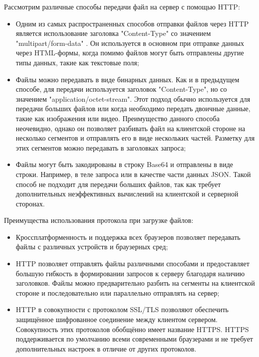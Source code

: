 	Рассмотрим различные способы передачи файл на сервер с помощью HTTP:
	\begin{itemize}[label=$\bullet$]
		\item Одним из самых распространенных способов отправки файлов через HTTP является использование заголовка "Content-Type" со значением "multipart/form-data" \cite{rfcHttp10}. Он используется в основном при отправке данных через HTML-формы, когда помимо файлов могут быть отправлены другие типы данных, такие как текстовые поля;
		\item Файлы можно передавать в виде бинарных данных. Как и в предыдущем способе, для передачи используется заголовок "Content-Type", но со значением "application/octet-stream". Этот подход обычно используется для передачи больших файлов или когда необходимо передать двоичные данные, такие как изображения или видео. Преимущество данного способа неочевидно, однако он позволяет разбивать файл на клиентской стороне на несколько сегментов и отправлять его в виде нескольких частей. Разметку для этих сегментов можно передавать в заголовках запроса;
		\item Файлы могут быть закодированы в строку Base64 и отправлены в виде строки. Например, в теле запроса или в качестве части данных JSON. Такой способ не подходит для передачи больших файлов, так как требует дополнительных неэффективных вычислений на клиентской и серверной сторонах.
	\end{itemize}

	Преимущества использования протокола при загрузке файлов:
	\begin{itemize}[label=$\bullet$]
		\item Кроссплатформенность и поддержка всех браузеров позволяет передавать файлы с различных устройств и браузерных сред;
		\item HTTP позволяет отправлять файлы различными способами и предоставляет большую гибкость в формировании запросов к серверу благодаря наличию заголовков. Файлы можно предварительно разбить на сегменты на клиентской стороне и последовательно или параллельно отправлять на сервер;
		\item HTTP в совокупности с протоколом SSL/TLS позволяют обеспечить защищённое шифрованное соединение между клиентом сервером. Совокупность этих протоколов обобщённо имеет название HTTPS. HTTPS поддерживается по умолчанию всеми современными браузерами и не требует дополнительных настроек в отличие от других протоколов.
	\end{itemize}
	
